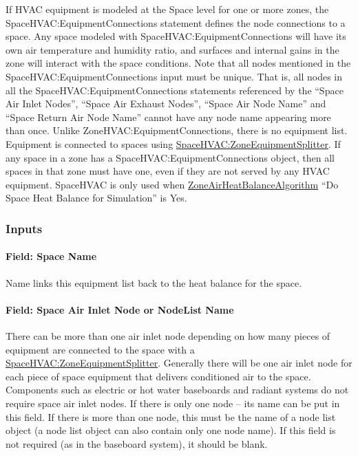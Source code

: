 If HVAC equipment is modeled at the Space level for one or more zones, the SpaceHVAC:EquipmentConnections statement defines the node connections to a space. Any space modeled with SpaceHVAC:EquipmentConnections will have its own air temperature and humidity ratio, and surfaces and internal gains in the zone will interact with the space conditions.
Note that all nodes mentioned in the SpaceHVAC:EquipmentConnections input must be unique. That is, all nodes in all the SpaceHVAC:EquipmentConnections statements referenced by the ``Space Air Inlet Nodes'', ``Space Air Exhaust Nodes'', ``Space Air Node Name'' and ``Space Return Air Node Name'' cannot have any node name appearing more than once. Unlike ZoneHVAC:EquipmentConnections, there is no equipment list. Equipment is connected to spaces using \hyperref[spacehvaczoneequipmentsplitter]{SpaceHVAC:ZoneEquipmentSplitter}. If any space in a zone has a SpaceHVAC:EquipmentConnections object, then all spaces in that zone must have one, even if they are not served by any HVAC equipment. SpaceHVAC is only used when \hyperref[zoneairheatbalancealgorithm]{ZoneAirHeatBalanceAlgorithm} ``Do Space Heat Balance for Simulation'' is Yes. 

\subsubsection{Inputs}\label{inputs-space-1-052}

\paragraph{Field: Space Name}\label{field-space-name-015}

Name links this equipment list back to the heat balance for the space.

\paragraph{Field: Space Air Inlet Node or NodeList Name}\label{field-space-air-inlet-node-or-nodelist-name}

There can be more than one air inlet node depending on how many pieces of equipment are connected to the space with a \hyperref[spacehvaczoneequipmentsplitter]{SpaceHVAC:ZoneEquipmentSplitter}. Generally there will be one air inlet node for each piece of space equipment that delivers conditioned air to the space. Components such as electric or hot water baseboards and radiant systems do not require space air inlet nodes. If there is only one node -- its name can be put in this field. If there is more than one node, this must be the name of a node list object (a node list object can also contain only one node name). If this field is not required (as in the baseboard system), it should be blank.

